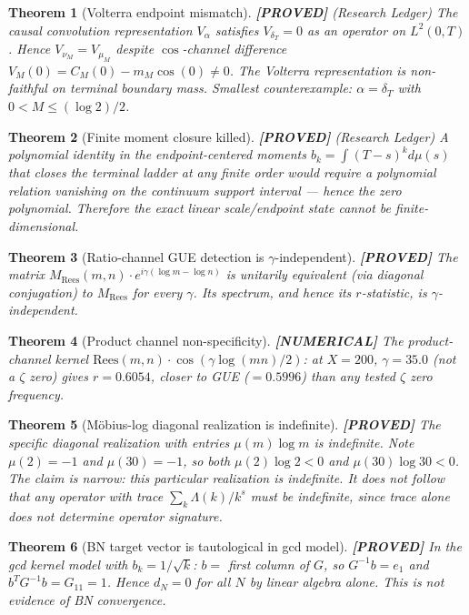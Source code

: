 \documentclass[11pt]{article}
\newtheorem{theorem}{Theorem}[section]
\theoremstyle{remark}
\newcommand{\PROVED}{\textbf{\color{blue}[PROVED]}}
\newcommand{\NUMERICAL}{\textbf{\color{orange}[NUMERICAL]}}
\DeclareRobustCommand{\_}{\ifmmode\text{\textunderscore}\else\textunderscore\allowbreak\fi}
\begin{document}
\begin{theorem}[Volterra endpoint mismatch] \PROVED{} (Research Ledger)
The causal convolution representation $V_\alpha$ satisfies $V_{\delta_T} = 0$ as an operator on $L^2(0,T)$.
Hence $V_{\nu_M} = V_{\mu_M}$ despite $\cos$-channel difference $V_M(0) = C_M(0) - m_M \cos(0) \neq 0$.
The Volterra representation is non-faithful on terminal boundary mass.
Smallest counterexample: $\alpha = \delta_T$ with $0 < M \leq (\log 2)/2$.
\end{theorem}

\begin{theorem}[Finite moment closure killed] \PROVED{} (Research Ledger)
A polynomial identity in the endpoint-centered moments $b_k = \int (T-s)^k d\mu(s)$
that closes the terminal ladder at any finite order would require a polynomial relation
vanishing on the continuum support interval --- hence the zero polynomial.
Therefore the exact linear scale/endpoint state cannot be finite-dimensional.
\end{theorem}

\begin{theorem}[Ratio-channel GUE detection is $\gamma$-independent] \PROVED{}
The matrix $M_{\mathrm{Rees}}(m,n) \cdot e^{i\gamma(\log m - \log n)}$ is unitarily equivalent
(via diagonal conjugation) to $M_{\mathrm{Rees}}$ for every $\gamma$.
Its spectrum, and hence its $r$-statistic, is $\gamma$-independent.
\end{theorem}

\begin{theorem}[Product channel non-specificity] \NUMERICAL{}
The product-channel kernel $\mathrm{Rees}(m,n) \cdot \cos(\gamma \log(mn)/2)$:
at $X=200$, $\gamma = 35.0$ (not a $\zeta$ zero) gives $r = 0.6054$,
closer to GUE ($= 0.5996$) than any tested $\zeta$ zero frequency.
\end{theorem}

\begin{theorem}[M\"obius-log diagonal realization is indefinite] \PROVED{}
The specific diagonal realization with entries $\mu(m)\log m$ is indefinite.
Note $\mu(2) = -1$ and $\mu(30) = -1$, so both $\mu(2)\log 2 < 0$ and $\mu(30)\log 30 < 0$.
The claim is narrow: this particular realization is indefinite. It does not follow that
any operator with trace $\sum_k \Lambda(k)/k^s$ must be indefinite, since trace
alone does not determine operator signature.
\end{theorem}

\begin{theorem}[BN target vector is tautological in gcd model] \PROVED{}
In the gcd kernel model with $b_k = 1/\sqrt{k}$:
$b = $ first column of $G$, so $G^{-1}b = e_1$ and $b^T G^{-1} b = G_{11} = 1$.
Hence $d_N = 0$ for all $N$ by linear algebra alone.
This is not evidence of BN convergence.
\end{theorem}
\end{document}
